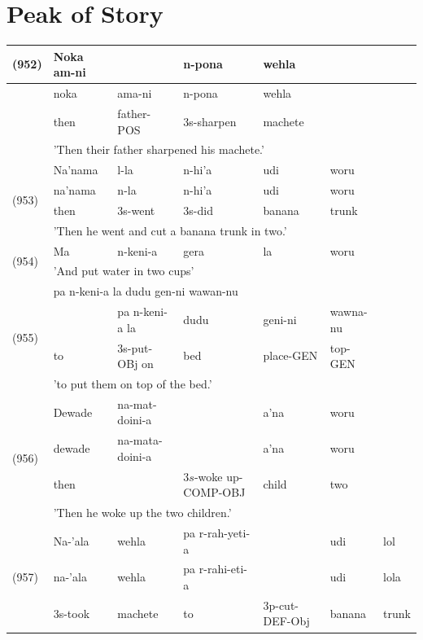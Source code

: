\documentclass[10pt]{article}
\begin{document}
\section*{Peak of Story}
\begin{center}
\begin{tabular}{|l|l|l|l|l|l|l|}
\hline
\multirow[t]{4}{*}{(952)} & Noka am-ni &  & n-pona & wehla &  &  \\
\hline
 & noka & ama-ni & n-pona & wehla &  &  \\
\hline
 & then & father-POS & 3s-sharpen & machete &  &  \\
\hline
 & \multicolumn{6}{|l|}{'Then their father sharpened his machete.'} \\
\hline
\multirow[t]{4}{*}{(953)} & Na'nama & l-la & n-hi'a & udi & woru &  \\
\hline
 & na'nama & n-la & n-hi'a & udi & woru &  \\
\hline
 & then & 3s-went & 3s-did & banana & trunk &  \\
\hline
 & \multicolumn{6}{|l|}{'Then he went and cut a banana trunk in two.'} \\
\hline
\multirow[t]{2}{*}{(954)} & Ma & n-keni-a & gera & la & woru &  \\
\hline
 & \multicolumn{6}{|l|}{'And put water in two cups'} \\
\hline
\multirow[t]{4}{*}{(955)} & \multicolumn{6}{|l|}{pa n-keni-a la dudu gen-ni wawan-nu} \\
\hline
 &  & pa n-keni-a la & dudu & geni-ni & wawna-nu &  \\
\hline
 & to & 3s-put-OBj on & bed & place-GEN & top-GEN &  \\
\hline
 & \multicolumn{6}{|l|}{'to put them on top of the bed.'} \\
\hline
\multirow[t]{4}{*}{(956)} & Dewade & na-mat-doini-a &  & a'na & woru &  \\
\hline
 & dewade & na-mata-doini-a &  & a'na & woru &  \\
\hline
 & then &  & \(3 s\)-woke up-COMP-OBJ & child & two &  \\
\hline
 & \multicolumn{6}{|l|}{'Then he woke up the two children.'} \\
\hline
\multirow[t]{4}{*}{(957)} & Na-'ala & wehla & pa r-rah-yeti-a &  & udi & lol \\
\hline
 & na-'ala & wehla & pa r-rahi-eti-a &  & udi & lola \\
\hline
 & 3s-took & machete & to & 3p-cut-DEF-Obj & banana & trunk \\

\end{tabular}
\end{center}
\end{document}
